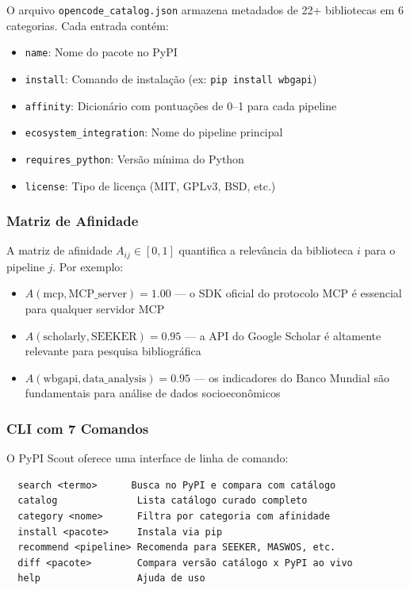 \documentclass[12pt,a4paper]{article}
\begin{document}
O arquivo \texttt{opencode\_catalog.json} armazena metadados de 22+ bibliotecas em 6 categorias. Cada entrada contém:

\begin{itemize}[itemsep=1pt]
  \item \texttt{name}: Nome do pacote no PyPI
  \item \texttt{install}: Comando de instalação (ex: \texttt{pip install wbgapi})
  \item \texttt{affinity}: Dicionário com pontuações de 0--1 para cada pipeline
  \item \texttt{ecosystem\_integration}: Nome do pipeline principal
  \item \texttt{requires\_python}: Versão mínima do Python
  \item \texttt{license}: Tipo de licença (MIT, GPLv3, BSD, etc.)
\end{itemize}

\subsubsection{Matriz de Afinidade}

A matriz de afinidade $A_{ij} \in [0,1]$ quantifica a relevância da biblioteca $i$ para o pipeline $j$. Por exemplo:

\begin{itemize}[itemsep=1pt]
  \item $A(\text{mcp}, \text{MCP\_server}) = 1.00$ --- o SDK oficial do protocolo MCP é essencial para qualquer servidor MCP
  \item $A(\text{scholarly}, \text{SEEKER}) = 0.95$ --- a API do Google Scholar é altamente relevante para pesquisa bibliográfica
  \item $A(\text{wbgapi}, \text{data\_analysis}) = 0.95$ --- os indicadores do Banco Mundial são fundamentais para análise de dados socioeconômicos
\end{itemize}

\subsubsection{CLI com 7 Comandos}

O PyPI Scout oferece uma interface de linha de comando:

\begin{verbatim}
  search <termo>      Busca no PyPI e compara com catálogo
  catalog              Lista catálogo curado completo
  category <nome>      Filtra por categoria com afinidade
  install <pacote>     Instala via pip
  recommend <pipeline> Recomenda para SEEKER, MASWOS, etc.
  diff <pacote>        Compara versão catálogo x PyPI ao vivo
  help                 Ajuda de uso
\end{verbatim}
\end{document}
